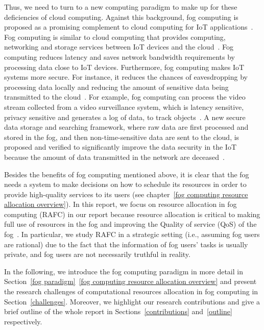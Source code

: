 \documentclass[11pt]{phdthesis}
\begin{document}

Thus, we need to turn to a new computing paradigm to make up for these deficiencies of cloud computing. Against this background, fog computing is proposed as a promising complement to cloud computing for IoT applications~\citep{bonomi2012fog}. Fog computing is similar to cloud computing that provides computing, networking and storage services between IoT devices and the cloud~\citep{bonomi2012fog}. Fog computing reduces latency and saves network bandwidth requirements by processing data close to IoT devices. Furthermore, fog computing makes IoT systems more secure. For instance, it reduces the chances of eavesdropping by processing data locally and reducing the amount of sensitive data being transmitted to the cloud~\citep{bonomi2012fog}.
For example, fog computing can process the video stream collected from a video surveillance system, which is latency sensitive, privacy sensitive and generates a log of data, to track objects~\citep{liu2018object}. A new secure data storage and searching framework, where raw data are first processed and stored in the fog, and then non-time-sensitive data are sent to the cloud, is proposed and verified to significantly improve the data security in the IoT because the amount of data transmitted in the network are deceased~\citep{fu2018secure}.

Besides the benefits of fog computing mentioned above, it is clear that the fog needs a system to make decisions on how to schedule its resources in order to provide high-quality services to its users (see chapter~\ref{fog computing resource allocation overview}). In this report, we focus on resource allocation in fog computing (RAFC) in our report because resource allocation is critical to making full use of resources in the fog and improving the Quality of service (QoS) of the fog~\citep{mahmud2018fog}. In particular, we study RAFC in a strategic setting (i.e., assuming fog users are rational) due to the fact that the information of fog users' tasks is usually private, and fog users are not necessarily truthful in reality.

In the following, we introduce the fog computing paradigm in more detail in Section~\ref{fog paradigm}~\ref{fog computing resource allocation overview} and present the research challenges of computational resources allocation in fog computing in Section~\ref{challenges}. Moreover, we highlight our research contributions and give a brief outline of the whole report in Sections~\ref{contributions} and~\ref{outline} respectively. 
\end{document}
